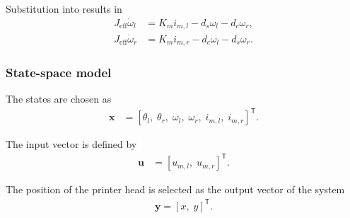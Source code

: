 \documentclass[a4paper,11pt]{article}
\begin{document}
Substitution into  results in 
\begin{align}
    J_{\text{eff}}\dot{\omega}_l &= K_m i_{m,l} - d_s\omega_l-d_c\omega_r,\label{eq:rotational_speed_l}\\
    J_{\text{eff}}\dot{\omega}_r &= K_m i_{m,r} - d_c\omega_l-d_s\omega_r.\label{eq:rotational_speed_r}
\end{align}

\subsubsection{State-space model}

The states are chosen as
\begin{align}
    \mathbf{x} &= \left[\theta_l ,\; \theta_r ,\; \omega_l ,\; \omega_r ,\; i_{m,l} ,\; i_{m,r}\right]^{\mathsf{T}}.
\end{align}

The input vector is defined by
\begin{align}
    \mathbf{u} &= \left[u_{m,l} ,\; u_{m,r}\right]^{\mathsf{T}}.
\end{align}

The position of the printer head is selected as the output vector of the system 
\begin{align}
    \mathbf{y} = \left[x ,\; y\right]^{\mathsf{T}}.
\end{align}
\end{document}
